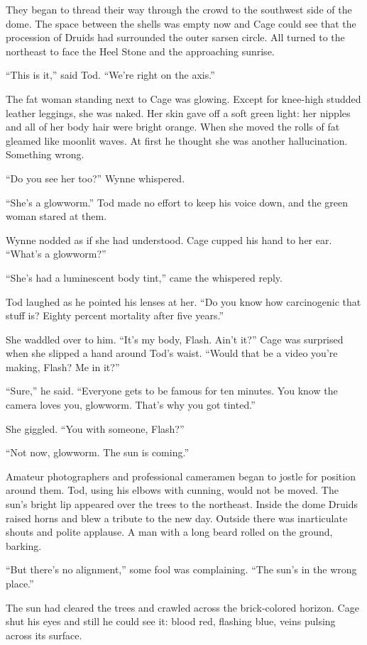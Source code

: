 They began to thread their way through the crowd to the southwest side of the dome. The space between the shells was empty now and Cage could see that the procession of Druids had surrounded the outer sarsen circle. All turned to the northeast to face the Heel Stone and the approaching sunrise.

``This is it,'' said Tod. ``We're right on the axis.''

The fat woman standing next to Cage was glowing. Except for knee-high studded leather leggings, she was naked. Her skin gave off a soft green light: her nipples and all of her body hair were bright orange. When she moved the rolls of fat gleamed like moonlit waves. At first he thought she was another hallucination. Something wrong.

``Do you see her too?'' Wynne whispered.

``She's a glowworm.'' Tod made no effort to keep his voice down, and the green woman stared at them.

Wynne nodded as if she had understood. Cage cupped his hand to her ear. ``What's a glowworm?''

``She's had a luminescent body tint,'' came the whispered reply.

Tod laughed as he pointed his lenses at her. ``Do you know how carcinogenic that stuff is? Eighty percent mortality after five years.''

She waddled over to him. ``It's my body, Flash. Ain't it?'' Cage was surprised when she slipped a hand around Tod's waist. ``Would that be a video you're making, Flash? Me in it?''

``Sure,'' he said. ``Everyone gets to be famous for ten minutes. You know the camera loves you, glowworm. That's why you got tinted.''

She giggled. ``You with someone, Flash?''

``Not now, glowworm. The sun is coming.''

Amateur photographers and professional cameramen began to jostle for position around them. Tod, using his elbows with cunning, would not be moved. The sun's bright lip appeared over the trees to the northeast. Inside the dome Druids raised horns and blew a tribute to the new day. Outside there was inarticulate shouts and polite applause. A man with a long beard rolled on the ground, barking.

``But there's no alignment,'' some fool was complaining. ``The sun's in the wrong place.''

The sun had cleared the trees and crawled across the brick-colored horizon. Cage shut his eyes and still he could see it: blood red, flashing blue, veins pulsing across its surface.

